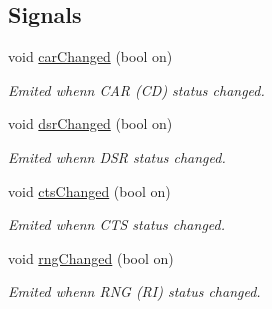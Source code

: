 \subsection*{Signals}
\begin{DoxyCompactItemize}
\item 
void \hyperlink{classmdt_abstract_serial_port_a63ddcadf5d8a63c479b0b6a24f89c837}{carChanged} (bool on)
\begin{DoxyCompactList}\small\item\em Emited whenn CAR (CD) status changed. \end{DoxyCompactList}\item 
void \hyperlink{classmdt_abstract_serial_port_a077d8c39ed12713742f1f2ffa0dca11d}{dsrChanged} (bool on)
\begin{DoxyCompactList}\small\item\em Emited whenn DSR status changed. \end{DoxyCompactList}\item 
void \hyperlink{classmdt_abstract_serial_port_adf45a5006218ef5660721ecdf8454b5d}{ctsChanged} (bool on)
\begin{DoxyCompactList}\small\item\em Emited whenn CTS status changed. \end{DoxyCompactList}\item 
void \hyperlink{classmdt_abstract_serial_port_a47c08ccb99dc6de76ae58ebeefc26857}{rngChanged} (bool on)
\begin{DoxyCompactList}\small\item\em Emited whenn RNG (RI) status changed. \end{DoxyCompactList}\end{DoxyCompactItemize}
